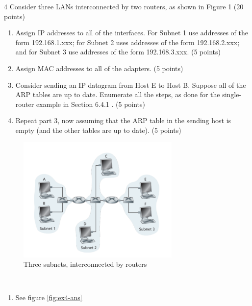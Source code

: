 \begin{exercise}[]{4 Consider three LANs interconnected by two routers, as shown in Figure 1 (20 points)
    \begin{enumerate}
        \item Assign IP addresses to all of the interfaces. For Subnet 1 use addresses of the form
        192.168.1.xxx; for Subnet 2 uses addresses of the form 192.168.2.xxx; and for Subnet
        3 use addresses of the form 192.168.3.xxx. (5 points)
        \item Assign MAC addresses to all of the adapters. (5 points)
        \item Consider sending an IP datagram from Host E to Host B. Suppose all of the ARP
        tables are up to date. Enumerate all the steps, as done for the single-router example
        in Section 6.4.1 . (5 points)
        \item Repeat part 3, now assuming that the ARP table in the sending host is empty (and
        the other tables are up to date). (5 points)
    \end{enumerate}
    \begin{figure}[hb]
      \begin{center}
      \includegraphics[width=8cm]{img/ass5/ex4}
      \caption{Three subnets, interconnected by routers}
      \label{fig:ex4}
      \end{center}
    \end{figure}
    }
  \begin{solution}
  \par{~}
  \begin{enumerate}
    \item See figure \ref{fig:ex4-ans}
    

\end{enumerate}
\end{solution}
\end{exercise}
